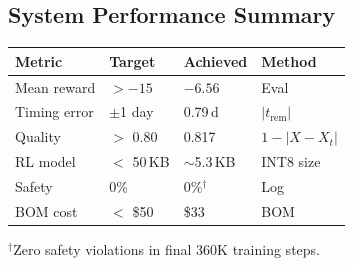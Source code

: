 \documentclass[conference]{IEEEtran}
\begin{document}
\subsection{System Performance Summary}

\begin{center}
\small
\begin{tabular}{@{}lp{1.6cm}p{1.3cm}l@{}}
\toprule
\textbf{Metric} & \textbf{Target} & \textbf{Achieved} & \textbf{Method} \\
\midrule
Mean reward & $> -15$ & $-6.56$ & Eval \\
Timing error & $\pm$1 day & 0.79\,d & $|t_{\text{rem}}|$ \\
Quality & $>$ 0.80 & 0.817 & $1{-}|X{-}X_t|$ \\
RL model & $<$ 50\,KB & $\sim$5.3\,KB & INT8 size \\
Safety & 0\% & 0\%$^\dagger$ & Log \\
BOM cost & $<$ \$50 & \$33 & BOM \\
\bottomrule
\end{tabular}
\label{tab:benchmarks}
\end{center}
{\scriptsize $^\dagger$Zero safety violations in final 360K training steps.}


\nocite{*}

\end{document}
